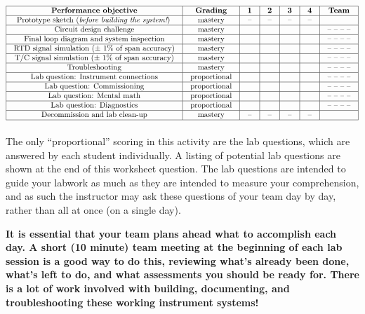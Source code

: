 \begin{itemize}


$$\vbox{\offinterlineskip
\halign{\strut
\vrule \quad\hfil # \ \hfil & 
\vrule \quad\hfil # \ \hfil & 
\vrule \quad\hfil # \ \hfil & 
\vrule \quad\hfil # \ \hfil & 
\vrule \quad\hfil # \ \hfil & 
\vrule \quad\hfil # \ \hfil & 
\vrule \quad\hfil # \ \hfil \vrule \cr
\noalign{\hrule}
%
{\bf Performance objective} & {\bf Grading} & {\bf 1} & {\bf 2} & {\bf 3} & {\bf 4} & {\bf Team} \cr
%
\noalign{\hrule}
%
Prototype sketch ({\it before building the system!}) & mastery & -- & -- & -- & -- & \cr
%
\noalign{\hrule}
%
Circuit design challenge & mastery & & & & & -- -- -- -- \cr
%
\noalign{\hrule}
%
Final loop diagram and system inspection & mastery & & & & & -- -- -- -- \cr
%
\noalign{\hrule}
%
RTD signal simulation ($\pm$ 1\% of span accuracy) & mastery & & & & & -- -- -- -- \cr
%
\noalign{\hrule}
%
T/C signal simulation ($\pm$ 1\% of span accuracy) & mastery & & & & & -- -- -- -- \cr
%
\noalign{\hrule}
%
Troubleshooting & mastery & & & & & -- -- -- -- \cr
%
\noalign{\hrule}
%
Lab question: Instrument connections & proportional &  &  &  &  & -- -- -- -- \cr
%
\noalign{\hrule}
%
Lab question: Commissioning & proportional &  &  &  &  & -- -- -- -- \cr
%
\noalign{\hrule}
%
Lab question: Mental math & proportional &  &  &  &  & -- -- -- -- \cr
%
\noalign{\hrule}
%
Lab question: Diagnostics & proportional &  &  &  &  & -- -- -- -- \cr
%
\noalign{\hrule}
%
Decommission and lab clean-up & mastery & -- & -- & -- & -- &  \cr
%
\noalign{\hrule}
} %
}$$ %

The only ``proportional'' scoring in this activity are the lab questions, which are answered by each student individually.  A listing of potential lab questions are shown at the end of this worksheet question.  The lab questions are intended to guide your labwork as much as they are intended to measure your comprehension, and as such the instructor may ask these questions of your team day by day, rather than all at once (on a single day).

\vskip 10pt

{\bf It is essential that your team plans ahead what to accomplish each day.  A short (10 minute) team meeting at the beginning of each lab session is a good way to do this, reviewing what's already been done, what's left to do, and what assessments you should be ready for.  There is a lot of work involved with building, documenting, and troubleshooting these working instrument systems!}


\end{itemize}
